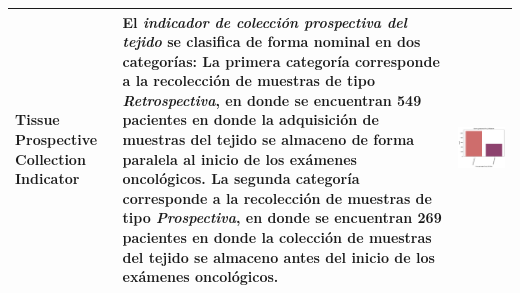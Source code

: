 \begin{table}[!htb]
	\footnotesize
	\begin{threeparttable}
		\begin{tabular}{p{2.5cm} p{7cm} p{6.5cm}} \toprule
			
			Tissue Prospective Collection Indicator
			& El \textit{indicador de colección prospectiva del tejido} se clasifica de forma nominal en dos categorías: La primera categoría corresponde a la recolección de muestras de tipo \textit{Retrospectiva}, en donde se encuentran 549 pacientes en donde la adquisición de muestras del tejido se almaceno de forma paralela al inicio de los exámenes oncológicos. La segunda categoría corresponde a la recolección de muestras de tipo \textit{Prospectiva}, en donde se encuentran 269 pacientes en donde la colección de muestras del tejido se almaceno antes del inicio de los exámenes oncológicos.
			
			& \begin{center}\includegraphics[width=1\linewidth]{NOTEBOOK/IMAGENES_DESCRIPTIVAS/36_tissue_prospective_indicator}\end{center}
			\\ \hline
			

\end{tabular}
\end{threeparttable}
\end{table}
